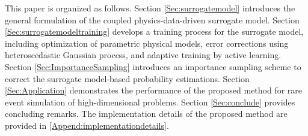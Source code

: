 \documentclass[number,preprint,3p]{elsarticle}
\newcommand{\1}[2]{\mathbb{I}_{#1}\left(#2\right)}
\begin{document}
	This paper is organized as follows. Section \ref{Sec:surrogatemodel} introduces the general formulation of the coupled physics-data-driven surrogate model. Section \ref{Sec:surrogatemodeltraining} develops a training process for the surrogate model, including optimization of parametric physical models, error corrections using heteroscedastic Gaussian process, and adaptive training by active learning. Section \ref{Sec:ImportanceSampling} introduces an importance sampling scheme to correct the surrogate model-based probability estimations. Section \ref{Sec:Application} demonstrates the performance of the proposed method for rare event simulation of high-dimensional problems. Section \ref{Sec:conclude} provides concluding remarks. The implementation details of the proposed method are provided in \ref{Append:implementationdetails}.
	
\end{document}
